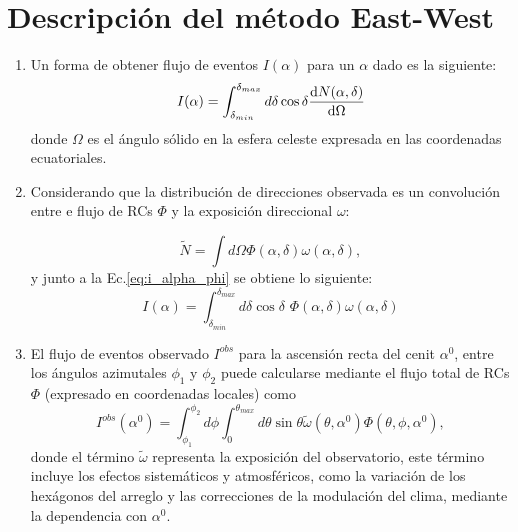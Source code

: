 \section{Descripción del método East-West}
\begin{enumerate}
    \item Un forma de obtener flujo de eventos $I(\alpha)$  para un $\alpha$ dado es la siguiente:
        \begin{equation}
            I(\alpha) = \int_{\delta_{min}}^{\delta_{max}} d\delta \cos \delta \dv{N(\alpha,\delta)}{\Omega}
            \label{eq:i_alpha_phi}
        \end{equation}
    \noindent donde $\Omega$ es el ángulo sólido en la esfera celeste expresada en las coordenadas ecuatoriales.

    \item Considerando que la distribución de direcciones observada es un convolución entre e flujo de RCs $\Phi$ y la exposición direccional $\omega$:
    
        \begin{equation}
            \tilde{N} = \int d\Omega \Phi(\alpha, \delta) \omega(\alpha, \delta),
            \label{eq:conv}
        \end{equation}
    \noindent y junto a la Ec.\ref{eq:i_alpha_phi}  se obtiene lo siguiente:
    \begin{equation}
        I(\alpha) =  \int_{\delta_{min}}^{\delta_{max}} d\delta \cos\delta \,\, \Phi(\alpha, \delta) \omega(\alpha, \delta)
        \label{eq:i_coor_ecua}
    \end{equation}


    \item El flujo de eventos observado $I^{obs}$ para la ascensión recta del cenit $\alpha^0$, entre los ángulos azimutales $\phi_1$ y $\phi_2$ puede calcularse mediante el flujo total de RCs $\Phi$ (expresado en coordenadas locales) como
    \begin{equation}
        I^{obs}(\alpha^0) = \int_{\phi_1}^{\phi_2} d\phi \int_{0}^{\theta_{max}} d\theta \sin\theta \tilde{\omega}(\theta, \alpha^0) \Phi(\theta, \phi, \alpha^0),
        \label{eq:rate_general}
    \end{equation}
    \noindent  donde  el término $\tilde{\omega}$ representa la exposición del observatorio, este término incluye los efectos sistemáticos y atmosféricos, como la variación de los hexágonos del arreglo y las correcciones de la modulación del clima, mediante  la dependencia con $\alpha^0$.


\end{enumerate}
